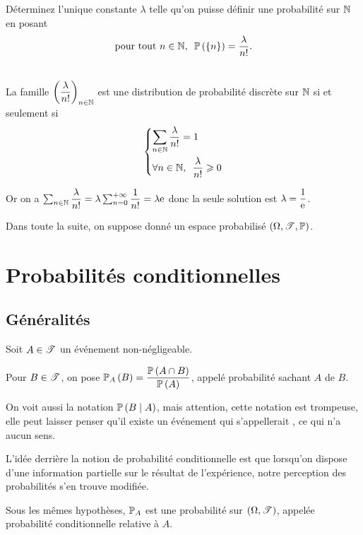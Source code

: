 \begin{exo}
Déterminez l'unique constante \(\lambda\) telle qu'on puisse définir une probabilité sur \(\N\) en posant \[\quantifs{\tpt n\in\N}\proba{\accol{n}}=\dfrac{\lambda}{n!}.\]
\end{exo}

\begin{corr}~\\
La famille \(\paren{\dfrac{\lambda}{n!}}_{n\in\N}\) est une distribution de probabilité discrète sur \(\N\) si et seulement si \[\begin{dcases}
\sum_{n\in\N}\dfrac{\lambda}{n!}=1 \\
\quantifs{\forall n\in\N}\dfrac{\lambda}{n!}\geq0
\end{dcases}\]

Or on a \(\sum_{n\in\N}\dfrac{\lambda}{n!}=\lambda\sum_{n=0}^{\pinf}\dfrac{1}{n!}=\lambda\e{}\) donc la seule solution est \(\lambda=\dfrac{1}{\e{}}\).
\end{corr}

Dans toute la suite, on suppose donné un espace probabilisé \(\anneau{\Omega}[\fami{T}][\prem]\).

\section{Probabilités conditionnelles}

\subsection{Généralités}

\begin{defi}
Soit \(A\in\fami{T}\) un événement non-négligeable.

Pour \(B\in\fami{T}\), on pose \(\probacond{B}{A}=\dfrac{\proba{A\inter B}}{\proba{A}}\), appelé probabilité sachant \(A\) de \(B\).
\end{defi}

On voit aussi la notation \(\proba{B\tq A}\), mais attention, cette notation est trompeuse, elle peut laisser penser qu'il existe un événement qui s'appellerait , ce qui n'a aucun sens.

L'idée derrière la notion de probabilité conditionnelle est que lorsqu'on dispose d'une information partielle sur le résultat de l'expérience, notre perception des probabilités s'en trouve modifiée.

\begin{theo}
Sous les mêmes hypothèses, \(\prem_A\) est une probabilité sur \(\groupe{\Omega}[\fami{T}]\), appelée probabilité conditionnelle relative à \(A\).
\end{theo}

